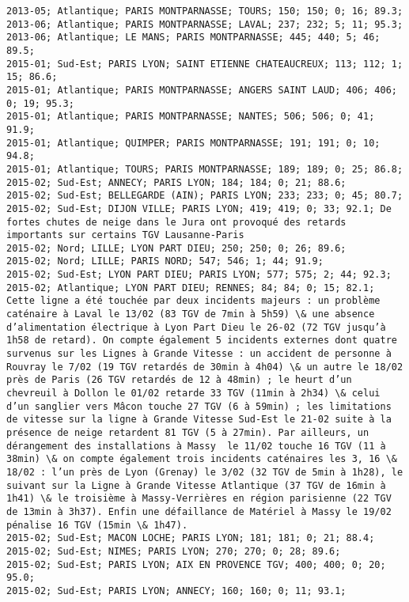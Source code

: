 \documentclass{article}
\begin{document}
\begin{Verbatim}[commandchars=\\\{\}]
2013-05; Atlantique; PARIS MONTPARNASSE; TOURS; 150; 150; 0; 16; 89.3; 
2013-06; Atlantique; PARIS MONTPARNASSE; LAVAL; 237; 232; 5; 11; 95.3; 
2013-06; Atlantique; LE MANS; PARIS MONTPARNASSE; 445; 440; 5; 46; 89.5; 
2015-01; Sud-Est; PARIS LYON; SAINT ETIENNE CHATEAUCREUX; 113; 112; 1; 15; 86.6; 
2015-01; Atlantique; PARIS MONTPARNASSE; ANGERS SAINT LAUD; 406; 406; 0; 19; 95.3; 
2015-01; Atlantique; PARIS MONTPARNASSE; NANTES; 506; 506; 0; 41; 91.9; 
2015-01; Atlantique; QUIMPER; PARIS MONTPARNASSE; 191; 191; 0; 10; 94.8; 
2015-01; Atlantique; TOURS; PARIS MONTPARNASSE; 189; 189; 0; 25; 86.8; 
2015-02; Sud-Est; ANNECY; PARIS LYON; 184; 184; 0; 21; 88.6; 
2015-02; Sud-Est; BELLEGARDE (AIN); PARIS LYON; 233; 233; 0; 45; 80.7; 
2015-02; Sud-Est; DIJON VILLE; PARIS LYON; 419; 419; 0; 33; 92.1; De fortes chutes de neige dans le Jura ont provoqué des retards importants sur certains TGV Lausanne-Paris
2015-02; Nord; LILLE; LYON PART DIEU; 250; 250; 0; 26; 89.6; 
2015-02; Nord; LILLE; PARIS NORD; 547; 546; 1; 44; 91.9; 
2015-02; Sud-Est; LYON PART DIEU; PARIS LYON; 577; 575; 2; 44; 92.3; 
2015-02; Atlantique; LYON PART DIEU; RENNES; 84; 84; 0; 15; 82.1; Cette ligne a été touchée par deux incidents majeurs : un problème caténaire à Laval le 13/02 (83 TGV de 7min à 5h59) \& une absence d’alimentation électrique à Lyon Part Dieu le 26-02 (72 TGV jusqu’à 1h58 de retard). On compte également 5 incidents externes dont quatre survenus sur les Lignes à Grande Vitesse : un accident de personne à Rouvray le 7/02 (19 TGV retardés de 30min à 4h04) \& un autre le 18/02 près de Paris (26 TGV retardés de 12 à 48min) ; le heurt d’un chevreuil à Dollon le 01/02 retarde 33 TGV (11min à 2h34) \& celui d’un sanglier vers Mâcon touche 27 TGV (6 à 59min) ; les limitations de vitesse sur la ligne à Grande Vitesse Sud-Est le 21-02 suite à la présence de neige retardent 81 TGV (5 à 27min). Par ailleurs, un dérangement des installations à Massy  le 11/02 touche 16 TGV (11 à 38min) \& on compte également trois incidents caténaires les 3, 16 \& 18/02 : l’un près de Lyon (Grenay) le 3/02 (32 TGV de 5min à 1h28), le suivant sur la Ligne à Grande Vitesse Atlantique (37 TGV de 16min à 1h41) \& le troisième à Massy-Verrières en région parisienne (22 TGV de 13min à 3h37). Enfin une défaillance de Matériel à Massy le 19/02 pénalise 16 TGV (15min \& 1h47). 
2015-02; Sud-Est; MACON LOCHE; PARIS LYON; 181; 181; 0; 21; 88.4; 
2015-02; Sud-Est; NIMES; PARIS LYON; 270; 270; 0; 28; 89.6; 
2015-02; Sud-Est; PARIS LYON; AIX EN PROVENCE TGV; 400; 400; 0; 20; 95.0; 
2015-02; Sud-Est; PARIS LYON; ANNECY; 160; 160; 0; 11; 93.1; 

\end{Verbatim}
\end{document}
